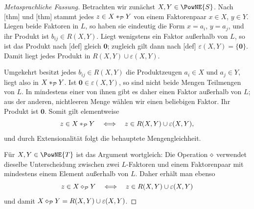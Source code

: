 \documentclass[main.tex]{subfiles}
\begin{document}
\begin{proof}[Metasprachliche Fassung]
Betrachten wir zunächst \(X,Y\in\PowNE{S}\). Nach
[thm] und
[thm] stammt jedes
\(z\in X\mathbin{\ast}_{\mathcal P}Y\) von einem Faktorenpaar \(x\in X\),
\(y\in Y\). Liegen beide Faktoren in \(L\), so haben sie eindeutig die
Form \(x=a_i\), \(y=a_j\), und ihr Produkt ist \(b_{ij}\in R(X,Y)\).
Liegt wenigstens ein Faktor außerhalb von \(L\), so ist das Produkt nach
[def] gleich \(\mathbf0\); zugleich
gilt dann nach [def]
\(\varepsilon(X,Y)=\{\mathbf0\}\). Damit liegt jedes Produkt in
\(R(X,Y)\cup\varepsilon(X,Y)\).

Umgekehrt besitzt jedes \(b_{ij}\in R(X,Y)\) die Produktzeugen
\(a_i\in X\) und \(a_j\in Y\), liegt also in
\(X\mathbin{\ast}_{\mathcal P}Y\). Ist \(\mathbf0\in\varepsilon(X,Y)\), so
sind nicht beide Mengen Teilmengen von \(L\). In mindestens einer von ihnen
gibt es daher einen Faktor außerhalb von \(L\); aus der anderen,
nichtleeren Menge wählen wir einen beliebigen Faktor. Ihr Produkt ist
\(\mathbf0\). Somit gilt elementweise
\[
  z\in X\mathbin{\ast}_{\mathcal P}Y
  \quad\Longleftrightarrow\quad
  z\in R(X,Y)\cup\varepsilon(X,Y),
\]
und durch Extensionalität folgt die behauptete Mengengleichheit.

Für \(X,Y\in\PowNE{T}\) ist das Argument wortgleich: Die Operation
\(\mathbin{\diamond}\) verwendet dieselbe Unterscheidung zwischen zwei
\(L\)-Faktoren und einem Faktorenpaar mit mindestens einem Element außerhalb
von \(L\). Daher erhält man ebenso
\[
  z\in X\mathbin{\diamond}_{\mathcal P}Y
  \quad\Longleftrightarrow\quad
  z\in R(X,Y)\cup\varepsilon(X,Y)
\]
und damit
\(X\mathbin{\diamond}_{\mathcal P}Y=R(X,Y)\cup\varepsilon(X,Y)\).
\end{proof}
\end{document}
